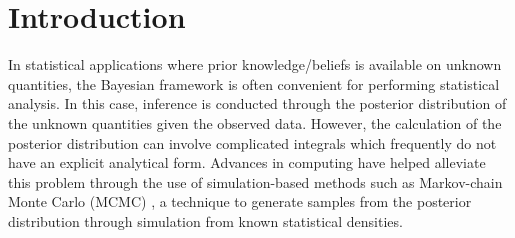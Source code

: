\documentclass[useAMS,referee,usenatbib]{biom}
\begin{document}

%

\fontsize{10}{12}\selectfont

\section{Introduction \label{sec:intro}}

In statistical applications where prior knowledge/beliefs is available on unknown quantities, the Bayesian framework is often convenient for performing statistical analysis.  In this case, inference is conducted through the posterior distribution of the unknown quantities given the observed data.  However, the calculation of the posterior distribution can involve complicated integrals which frequently do not have an explicit analytical form.  Advances in computing have helped alleviate this problem through the use of simulation-based methods such as Markov-chain Monte Carlo (MCMC) \citep{Gelf:Smit:samp:1990}, a technique to generate samples from the posterior distribution through simulation from known statistical densities.
\end{document}
